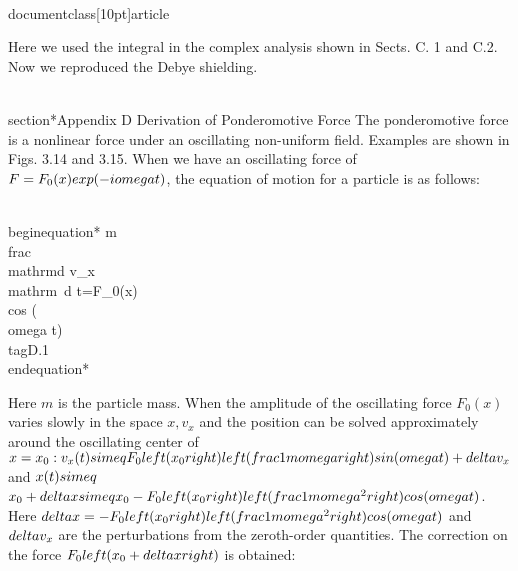 \\documentclass[10pt]{article}
\begin{document}
{{{{{{Here we used the integral in the complex analysis shown in Sects. C. 1 and C.2. Now we reproduced the Debye shielding.

\\section*{Appendix D Derivation of Ponderomotive Force}
The ponderomotive force is a nonlinear force under an oscillating non-uniform field. Examples are shown in Figs. 3.14 and 3.15. When we have an oscillating force of $F=F_{0}(x) \\exp (-i \\omega t)$, the equation of motion for a particle is as follows:


\\begin{equation*}
m \\frac{\\mathrm{d} v_{x}}{\\mathrm{~d} t}=F_{0}(x) \\cos (\\omega t) \\tag{D.1}
\\end{equation*}


Here $m$ is the particle mass. When the amplitude of the oscillating force $F_{0}(x)$ varies slowly in the space $x, v_{x}$ and the position can be solved approximately around the oscillating center of $x=x_{0}: v_{x}(t) \\simeq F_{0}\\left(x_{0}\\right)\\left(\\frac{1}{m \\omega}\\right) \\sin (\\omega t)+\\delta v_{x}$ and $x(t) \\simeq$ $x_{0}+\\delta x \\simeq x_{0}-F_{0}\\left(x_{0}\\right)\\left(\\frac{1}{m \\omega^{2}}\\right) \\cos (\\omega t)$. Here $\\delta x=-F_{0}\\left(x_{0}\\right)\\left(\\frac{1}{m \\omega^{2}}\\right) \\cos (\\omega t)$ and $\\delta v_{x}$ are the perturbations from the zeroth-order quantities. The correction on the force $F_{0}\\left(x_{0}+\\delta x\\right)$ is obtained:


}}}}}}
\end{document}
